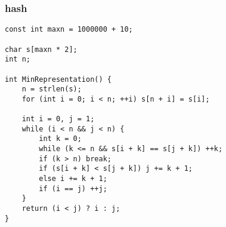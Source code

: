 \subsubsection{hash}
\begin{verbatim}
const int maxn = 1000000 + 10;

char s[maxn * 2];
int n;

int MinRepresentation() {
	n = strlen(s);
	for (int i = 0; i < n; ++i) s[n + i] = s[i];

	int i = 0, j = 1;
	while (i < n && j < n) {
		int k = 0;
		while (k <= n && s[i + k] == s[j + k]) ++k;
		if (k > n) break;
		if (s[i + k] < s[j + k]) j += k + 1;
		else i += k + 1;
		if (i == j) ++j;
	}
	return (i < j) ? i : j;
}
\end{verbatim}
